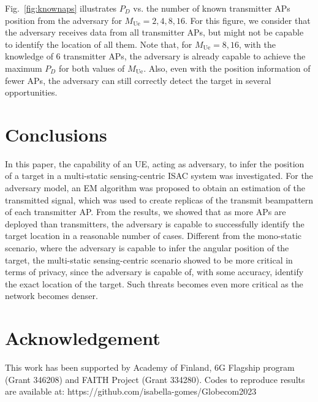 \documentclass[conference,twocolumn,a4paper]{IEEEtran}
\theoremstyle{remark} \newtheorem{remark}{Remark}
\begin{document}
Fig.~\ref{fig:knownaps} illustrates $P_D$ vs. the number of known transmitter APs position from the adversary for $M_{\mathrm{Ue}}$$=$$2,4, 8, 16$. For this figure, we consider that the adversary receives data from all transmitter APs, but might not be capable to identify the location of all them. Note that, for $M_{\mathrm{Ue}}$$=$$8, 16$, with the knowledge of 6 transmitter APs, the adversary is already capable to achieve the maximum $P_D$ for both values of $M_{\mathrm{Ue}}$. Also, even with the position information of fewer APs, the adversary can still correctly detect the target in several opportunities. %

\section{Conclusions}
In this paper, the capability of an UE, acting as adversary, to infer the position of a target in a multi-static sensing-centric ISAC system was investigated. For the adversary model, an EM algorithm was proposed to obtain an estimation of the transmitted signal, which was used to create replicas of the transmit beampattern of each transmitter AP. From the results, we showed that as more APs are deployed than transmitters, the adversary is capable to successfully identify the target location in a reasonable number of cases. Different from the mono-static scenario, where the adversary is capable to infer the angular position of the target, the multi-static sensing-centric scenario showed to be more critical in terms of privacy, since the adversary is capable of, with some accuracy, identify the exact location of the target. Such threats becomes even more critical as the network becomes denser.  


\section*{Acknowledgement}
This work has been supported by Academy of Finland, 6G Flagship program (Grant 346208) and FAITH Project (Grant 334280). Codes to reproduce results are available at: https://github.com/isabella-gomes/Globecom2023


\end{document}
